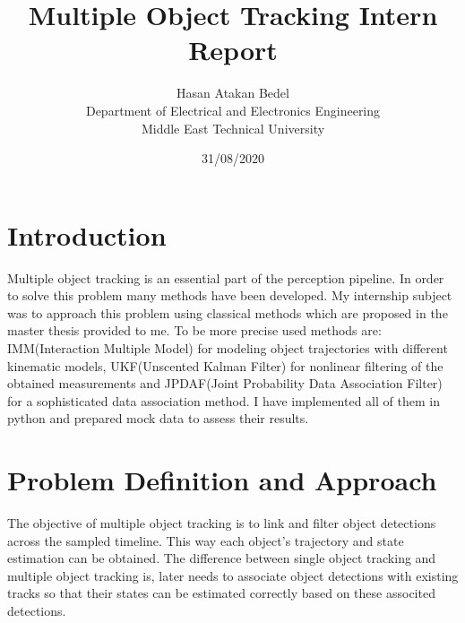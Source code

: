 \documentclass[peerreview]{IEEEtran}
\begin{document}
\title{Multiple Object Tracking Intern Report}



\author{Hasan Atakan Bedel \\
Department of Electrical and Electronics Engineering\\
Middle East Technical University\\
}
\date{31/08/2020}

\maketitle
\tableofcontents
\listoffigures
\listoftables

\IEEEpeerreviewmaketitle





\section{Introduction}
Multiple object tracking is an essential part of the perception pipeline. In order to solve this problem many methods have been developed. My internship subject was to approach this problem using classical methods which are proposed in the master thesis provided to me. To be more precise used methods are: IMM(Interaction Multiple Model) for modeling object trajectories with different kinematic models, UKF(Unscented Kalman Filter) for nonlinear filtering of the obtained measurements and JPDAF(Joint Probability Data Association Filter) for a sophisticated data association method. I have implemented all of them in python and prepared mock data to assess their results. 



\section{Problem Definition and Approach}
The objective of multiple object tracking is to link and filter object detections across the sampled timeline. This way each object's trajectory and state estimation can be obtained. The difference between single object tracking and multiple object tracking is, later needs to associate object detections with existing tracks so that their states can be estimated correctly based on these  associted detections. 
\end{document}
